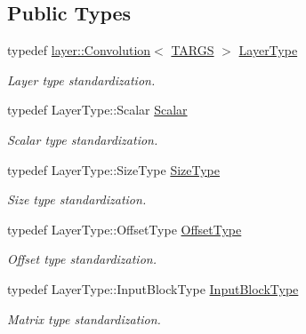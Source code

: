 \subsection*{Public Types}
\begin{DoxyCompactItemize}
\item 
typedef \hyperlink{classffnn_1_1layer_1_1_convolution}{layer\-::\-Convolution}$<$ \hyperlink{optimizer_2gradient__descent_2specializations_2convolution_8hpp_a005b9b79411aa786124330e813a99057}{T\-A\-R\-G\-S} $>$ \hyperlink{classffnn_1_1optimizer_1_1_gradient_descent_3_01layer_1_1_convolution_3_01_t_a_r_g_s_01_4_01_4_a4b4e11ad265dd0fba9010b60d6cea09b}{Layer\-Type}
\begin{DoxyCompactList}\small\item\em Layer type standardization. \end{DoxyCompactList}\item 
typedef Layer\-Type\-::\-Scalar \hyperlink{classffnn_1_1optimizer_1_1_gradient_descent_3_01layer_1_1_convolution_3_01_t_a_r_g_s_01_4_01_4_a6995cac929c8df2dd70dddf488998e66}{Scalar}
\begin{DoxyCompactList}\small\item\em Scalar type standardization. \end{DoxyCompactList}\item 
typedef Layer\-Type\-::\-Size\-Type \hyperlink{classffnn_1_1optimizer_1_1_gradient_descent_3_01layer_1_1_convolution_3_01_t_a_r_g_s_01_4_01_4_a02796dc7270c0180e5e0cfa57e015dde}{Size\-Type}
\begin{DoxyCompactList}\small\item\em Size type standardization. \end{DoxyCompactList}\item 
typedef Layer\-Type\-::\-Offset\-Type \hyperlink{classffnn_1_1optimizer_1_1_gradient_descent_3_01layer_1_1_convolution_3_01_t_a_r_g_s_01_4_01_4_adeba594318f6939122d3e0edb069d6d6}{Offset\-Type}
\begin{DoxyCompactList}\small\item\em Offset type standardization. \end{DoxyCompactList}\item 
typedef Layer\-Type\-::\-Input\-Block\-Type \hyperlink{classffnn_1_1optimizer_1_1_gradient_descent_3_01layer_1_1_convolution_3_01_t_a_r_g_s_01_4_01_4_a52ff7f9db21ea50795ccbc475a3cc643}{Input\-Block\-Type}
\begin{DoxyCompactList}\small\item\em Matrix type standardization. \end{DoxyCompactList}\item 

\end{DoxyCompactItemize}
